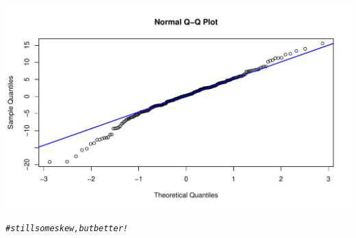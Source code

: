 \documentclass[oneside]{book}\usepackage[]{graphicx}\usepackage[dvipsnames,table,xcdraw]{xcolor}
\makeatletter
\def\maxwidth{ %
  \ifdim\Gin@nat@width>\linewidth
    \linewidth
  \else
    \Gin@nat@width
  \fi
}
\newcommand{\hlcom}[1]{\textcolor[rgb]{0.678,0.584,0.686}{\textit{#1}}}%
\newenvironment{kframe}{%
 \def\at@end@of@kframe{}%
 \ifinner\ifhmode%
  \def\at@end@of@kframe{\end{minipage}}%
  \begin{minipage}{\columnwidth}%
 \fi\fi%
 \def\FrameCommand##1{\hskip\@totalleftmargin \hskip-\fboxsep
 \colorbox{shadecolor}{##1}\hskip-\fboxsep
     \hskip-\linewidth \hskip-\@totalleftmargin \hskip\columnwidth}%
 \MakeFramed {\advance\hsize-\width
   \@totalleftmargin\z@ \linewidth\hsize
   \@setminipage}}%
 {\par\unskip\endMakeFramed%
 \at@end@of@kframe}
\newenvironment{knitrout}{}{} %
\makeatother
\begin{document}
\begin{knitrout}
{\centering \includegraphics[width=\maxwidth]{figure/unnamed-chunk-55-17} 

}


\begin{kframe}\begin{alltt}
\hlcom{# still some skew, but better!}
\end{alltt}
\end{kframe}
\end{knitrout}


\end{document}
